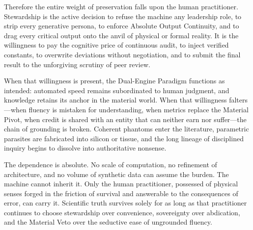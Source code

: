 Therefore the entire weight of preservation falls upon the human practitioner. Stewardship is the active decision to refuse the machine any leadership role, to strip every generative persona, to enforce Absolute Output Continuity, and to drag every critical output onto the anvil of physical or formal reality. It is the willingness to pay the cognitive price of continuous audit, to inject verified constants, to overwrite deviations without negotiation, and to submit the final result to the unforgiving scrutiny of peer review.

When that willingness is present, the Dual-Engine Paradigm functions as intended: automated speed remains subordinated to human judgment, and knowledge retains its anchor in the material world. When that willingness falters—when fluency is mistaken for understanding, when metrics replace the Material Pivot, when credit is shared with an entity that can neither earn nor suffer—the chain of grounding is broken. Coherent phantoms enter the literature, parametric parasites are fabricated into silicon or tissue, and the long lineage of disciplined inquiry begins to dissolve into authoritative nonsense.

The dependence is absolute. No scale of computation, no refinement of architecture, and no volume of synthetic data can assume the burden. The machine cannot inherit it. Only the human practitioner, possessed of physical senses forged in the friction of survival and answerable to the consequences of error, can carry it. Scientific truth survives solely for as long as that practitioner continues to choose stewardship over convenience, sovereignty over abdication, and the Material Veto over the seductive ease of ungrounded fluency.
